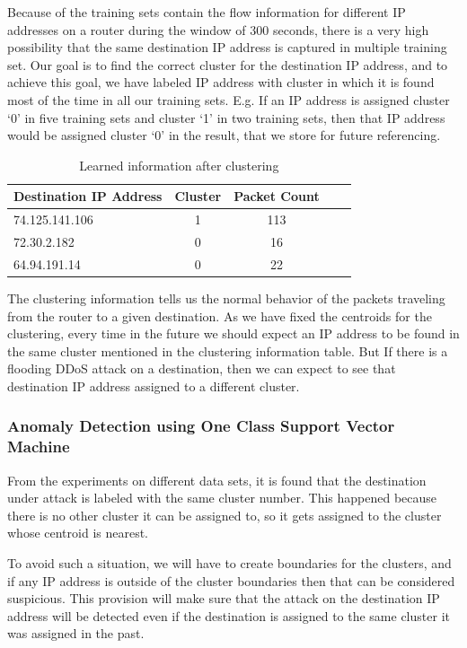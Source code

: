 \documentclass[12pt,oneside,a4paper]{article}
\begin{document}
Because of the training sets contain the flow information for different IP addresses on a router during the window of 300 seconds, there is a very high possibility that the same destination IP address is captured in multiple training set. Our goal is to find the correct cluster for the destination IP address, and to achieve this goal, we have labeled IP address with cluster in which it is found most of the time in all our training sets. E.g. If an IP address is assigned cluster `0' in five training sets and cluster `1' in two training sets, then that IP address would be assigned cluster `0' in the result, that we store for future referencing.

\begin{table}[H]
\centering
  \begin{tabular}{| l | c | c | c | c |}
    \hline
    {Destination IP Address}  &Cluster  &Packet Count \\
    \hline
    74.125.141.106  & 1     & 113  \\ \hline
    72.30.2.182     & 0     & 16   \\ \hline
    64.94.191.14    & 0     & 22   \\ \hline
  \end{tabular}
\caption{Learned information after clustering} \label{table:learned-clustering}
\end{table}

The clustering information tells us the normal behavior of the packets traveling from the router to a given destination. As we have fixed the centroids for the clustering, every time in the future we should expect an IP address to be found in the same cluster mentioned in the clustering information table. But If there is a flooding DDoS attack on a destination, then we can expect to see that destination IP address assigned to a different cluster.

\subsubsection{Anomaly Detection using One Class Support Vector Machine} \label{subsec:Anomaly_Detection}

From the experiments on different data sets, it is found that the destination under attack is labeled with the same cluster number. This happened because there is no other cluster it can be assigned to, so it gets assigned to the cluster whose centroid is nearest.

To avoid such a situation, we will have to create boundaries for the clusters, and if any IP address is outside of the cluster boundaries then that can be considered suspicious. This provision will make sure that the attack on the destination IP address will be detected even if the destination is assigned to the same cluster it was assigned in the past.
\end{document}
